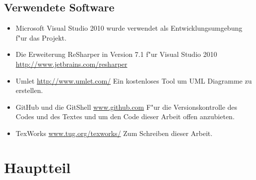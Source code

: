 \documentclass[pagesize, paper=a4, fontsize=12pt,titlepage=true, headings=small, headnosepline, abstractoff, liststotoc, nochapterprefix, plainheadsepline]{scrreprt}
\newcommand{\CSS}{C\texttt{\# }}
\newcommand{\HES}{Half-Edge Datenstruktur }
\begin{document}
	\section {Verwendete Software}
\begin{itemize}
\item Microsoft Visual Studio 2010 \newline wurde verwendet als Entwicklungsumgebung f"ur das Projekt.
\item Die Erweiterung ReSharper in Version 7.1 f"ur Visual Studio 2010 \url{http://www.jetbrains.com/resharper}
\item Umlet \url{http://www.umlet.com/} \newline Ein kostenloses Tool um UML Diagramme zu erstellen.
\item GitHub und die GitShell \url{www.github.com} \newline F"ur die Versionskontrolle des Codes und des Textes und um den Code dieser Arbeit offen anzubieten.
\item TexWorks \url{www.tug.org/texworks/} \newline Zum Schreiben dieser Arbeit.
\end{itemize}

\chapter {Hauptteil}
\end{document}
